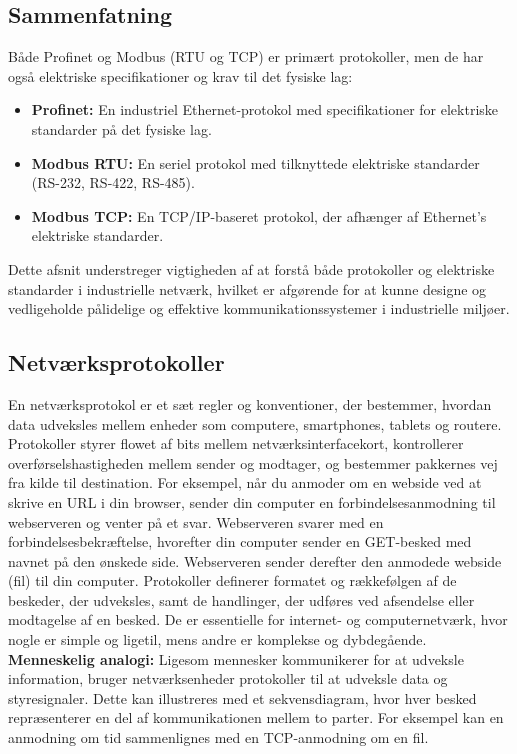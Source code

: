 \subsection{Sammenfatning}
Både Profinet og Modbus (RTU og TCP) er primært protokoller, men de har også elektriske specifikationer og krav til det fysiske lag:
\begin{itemize}
	\item \textbf{Profinet:} En industriel Ethernet-protokol med specifikationer for elektriske standarder på det fysiske lag.
	\item \textbf{Modbus RTU:} En seriel protokol med tilknyttede elektriske standarder (RS-232, RS-422, RS-485).
	\item \textbf{Modbus TCP:} En TCP/IP-baseret protokol, der afhænger af Ethernet's elektriske standarder.
\end{itemize}
Dette afsnit understreger vigtigheden af at forstå både protokoller og elektriske standarder i industrielle netværk, hvilket er afgørende for at kunne designe og vedligeholde pålidelige og effektive kommunikationssystemer i industrielle miljøer.	

\subsection{Netværksprotokoller}
En netværksprotokol er et sæt regler og konventioner, der bestemmer, hvordan data udveksles mellem enheder som computere, smartphones, tablets og routere. Protokoller styrer flowet af bits mellem netværksinterfacekort, kontrollerer overførselshastigheden mellem sender og modtager, og bestemmer pakkernes vej fra kilde til destination.
\newline
\newline
\noindent For eksempel, når du anmoder om en webside ved at skrive en URL i din browser, sender din computer en forbindelsesanmodning til webserveren og venter på et svar. Webserveren svarer med en forbindelsesbekræftelse, hvorefter din computer sender en GET-besked med navnet på den ønskede side. Webserveren sender derefter den anmodede webside (fil) til din computer.
\newline
\newline
\noindent Protokoller definerer formatet og rækkefølgen af de beskeder, der udveksles, samt de handlinger, der udføres ved afsendelse eller modtagelse af en besked. De er essentielle for internet- og computernetværk, hvor nogle er simple og ligetil, mens andre er komplekse og dybdegående.
\newline
\newline
\noindent\textbf{Menneskelig analogi:}
Ligesom mennesker kommunikerer for at udveksle information, bruger netværksenheder protokoller til at udveksle data og styresignaler. Dette kan illustreres med et sekvensdiagram, hvor hver besked repræsenterer en del af kommunikationen mellem to parter. For eksempel kan en anmodning om tid sammenlignes med en TCP-anmodning om en fil.


